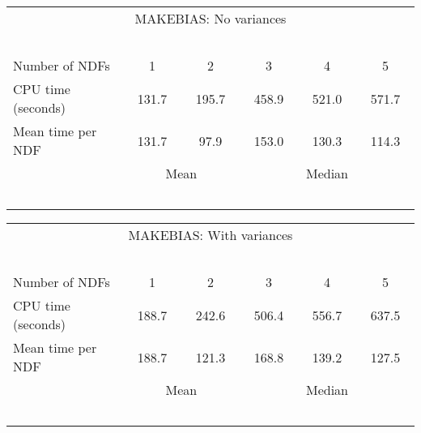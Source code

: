 \begin{center}
   \begin{tabular}{|l||c|c|c|c|c|}
   \multicolumn{6}{c}{MAKEBIAS: No variances} \\
   \multicolumn{6}{l}{~~~}
   \\ \hline
   Number of NDFs    & ~~~1~~~ & ~~~2~~~ & ~~~3~~~ & ~~~4~~~ & ~~~5~~~
    \\ \hline
   CPU time (seconds)&  131.7  & 195.7   & 458.9   &  521.0   & 571.7
    \\ \hline
   Mean time per NDF &  131.7  & 97.9    & 153.0   &  130.3   & 114.3
    \\ \hline
   \multicolumn{1}{c}{~~~}
   & \multicolumn{2}{c|}{Mean}
   & \multicolumn{3}{c}{Median}
   \\
   \multicolumn{6}{l}{~~~}
   \\
   \end{tabular}
   \begin{tabular}{|l||c|c|c|c|c|}
   \multicolumn{6}{c}{MAKEBIAS: With variances} \\
   \multicolumn{6}{l}{~~~}
   \\ \hline
   Number of NDFs    & ~~~1~~~ & ~~~2~~~ & ~~~3~~~ & ~~~4~~~ & ~~~5~~~
    \\ \hline
   CPU time (seconds)&  188.7  & 242.6   & 506.4   & 556.7   & 637.5
    \\ \hline
   Mean time per NDF &  188.7  & 121.3   & 168.8   & 139.2   & 127.5
    \\ \hline
   \multicolumn{1}{c}{~~~}
   & \multicolumn{2}{c|}{Mean}
   & \multicolumn{3}{c}{Median}
   \\
   \multicolumn{6}{l}{~~~}
   \\
   \end{tabular}
\end{center}

